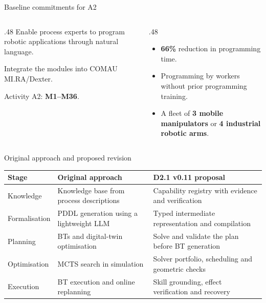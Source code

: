 \documentclass[aspectratio=169,10pt]{beamer}
\begin{document}
\begin{frame}{Baseline commitments for A2}
\begin{columns}[T]
\begin{column}{.48\textwidth}
Enable process experts to program robotic applications through natural language.\par
Integrate the modules into COMAU MI.RA/Dexter.\par
Activity A2: \textbf{M1--M36}.
\end{column}
\begin{column}{.48\textwidth}
\begin{itemize}\items
\item \textbf{66\%} reduction in programming time.
\item Programming by workers without prior programming training.
\item A fleet of \textbf{3 mobile manipulators} or \textbf{4 industrial robotic arms}.
\end{itemize}
\end{column}
\end{columns}
\end{frame}

\begin{frame}{Original approach and proposed revision}
\small\renewcommand{\arraystretch}{1.4}
\begin{tabularx}{\textwidth}{@{}p{}XX@{}}
\toprule
Stage & Original approach & D2.1 v0.11 proposal\\\midrule
Knowledge & Knowledge base from process descriptions & Capability registry with evidence and verification\\
Formalisation & PDDL generation using a lightweight LLM & Typed intermediate representation and compilation\\
Planning & BTs and digital-twin optimisation & Solve and validate the plan before BT generation\\
Optimisation & MCTS search in simulation & Solver portfolio, scheduling and geometric checks\\
Execution & BT execution and online replanning & Skill grounding, effect verification and recovery\\\bottomrule
\end{tabularx}
\end{frame}
\end{document}
